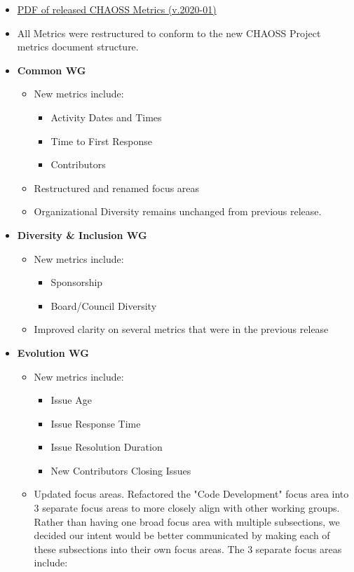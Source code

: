 \begin{itemize}
\tightlist
\item
  \href{https://chaoss.github.io/website/release/release-pdfs/CHAOSS-Metrics-Release-2020-01.pdf}{PDF
  of released CHAOSS Metrics (v.2020-01)}
\item
  All Metrics were restructured to conform to the new CHAOSS Project
  metrics document structure.
\item
  \textbf{Common WG}

  \begin{itemize}
  \tightlist
  \item
    New metrics include:

    \begin{itemize}
    \tightlist
    \item
      Activity Dates and Times
    \item
      Time to First Response
    \item
      Contributors
    \end{itemize}
  \item
    Restructured and renamed focus areas
  \item
    Organizational Diversity remains unchanged from previous release.
  \end{itemize}
\item
  \textbf{Diversity \& Inclusion WG}

  \begin{itemize}
  \tightlist
  \item
    New metrics include:

    \begin{itemize}
    \tightlist
    \item
      Sponsorship
    \item
      Board/Council Diversity
    \end{itemize}
  \item
    Improved clarity on several metrics that were in the previous
    release
  \end{itemize}
\item
  \textbf{Evolution WG}

  \begin{itemize}
  \tightlist
  \item
    New metrics include:

    \begin{itemize}
    \tightlist
    \item
      Issue Age
    \item
      Issue Response Time
    \item
      Issue Resolution Duration
    \item
      New Contributors Closing Issues
    \end{itemize}
  \item
    Updated focus areas. Refactored the "Code Development" focus area
    into 3 separate focus areas to more closely align with other working
    groups. Rather than having one broad focus area with multiple
    subsections, we decided our intent would be better communicated by
    making each of these subsections into their own focus areas. The 3
    separate focus areas include:


\end{itemize}
\end{itemize}
